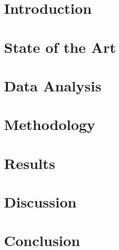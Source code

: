\documentclass[a4paper,11pt,twoside]{memoir}
\begin{document}
\chapter{Introduction}
\label{ch:intro}



\chapter{State of the Art}
\label{ch:state_of_the_art}



\chapter{Data Analysis}
\label{ch:data_analysis}



\chapter{Methodology}
\label{ch:methodology}



\chapter{Results}
\label{ch:results}



\chapter{Discussion}
\label{ch:discussion}



\chapter{Conclusion}
\label{ch:conclusion}




\appendix



\end{document}
